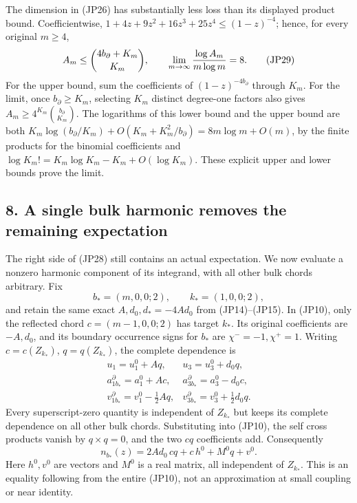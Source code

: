 \documentclass[11pt]{article}
\begin{document}
The dimension in (JP26) has substantially less loss than its displayed
product bound. Coefficientwise,
\(1+4z+9z^2+16z^3+25z^4\le(1-z)^{-4}\);
hence, for every original \(m\ge4\),
\[
 A_m\le {4b_\partial+K_m\choose K_m},\qquad
 \lim_{m\to\infty}{\log A_m\over m\log m}=8 .
 \tag{JP29}
\]
For the upper bound, sum the coefficients of \((1-z)^{-4b_\partial}\)
through \(K_m\). For the limit, once \(b_\partial\ge K_m\), selecting
\(K_m\) distinct degree-one factors also gives
\(A_m\ge4^{K_m}\binom{b_\partial}{K_m}\).
The logarithms of this lower bound and the upper bound are both
\(K_m\log(b_\partial/K_m)+O(K_m+K_m^2/b_\partial)
=8m\log m+O(m)\), by the finite products for the binomial
coefficients and \(\log K_m!=K_m\log K_m-K_m+O(\log K_m)\).
These explicit upper and lower bounds prove the limit.

\subsection*{8. A single bulk harmonic removes the remaining expectation}

The right side of (JP28) still contains an actual expectation. We now
evaluate a nonzero harmonic component of its integrand, with all other
bulk chords arbitrary. Fix
\[
 b_*=(m,0,0;2),\qquad k_*=(1,0,0;2),
\]
and retain the same exact \(A,d_0,d_*=-4Ad_0\) from (JP14)–(JP15).
In (JP10), only the reflected chord \(c=(m-1,0,0;2)\) has target
\(k_*\). Its original coefficients are \(-A,d_0\), and its boundary
occurrence signs for \(b_*\) are \(\chi^-=-1,\chi^+=1\).
Writing \(c=c(Z_{k_*})\), \(q=q(Z_{k_*})\), the complete dependence is
\[
 \begin{array}{ll}
 u_1=u_1^0+Aq,&u_3=u_3^0+d_0q,\\
 a_{1b_*}^{\partial}=a_1^0+Ac,
   &a_{3b_*}^{\partial}=a_3^0-d_0c,\\
 v_{1b_*}^{\partial}=v_1^0-\tfrac12Aq,
   &v_{3b_*}^{\partial}=v_3^0+\tfrac12d_0q .
 \end{array}\tag{JP30}
\]
Every superscript-zero quantity is independent of \(Z_{k_*}\) but
keeps its complete dependence on all other bulk chords. Substituting
into (JP10), the self cross products vanish by \(q\times q=0\),
and the two \(cq\) coefficients add. Consequently
\[
 n_{b_*}(z)=2Ad_0\,c q+c\,h^0+M^0q+v^0 .
 \tag{JP31}
\]
Here \(h^0,v^0\) are vectors and \(M^0\) is a real matrix, all independent
of \(Z_{k_*}\). This is an equality following from the entire (JP10),
not an approximation at small coupling or near identity.
\end{document}
